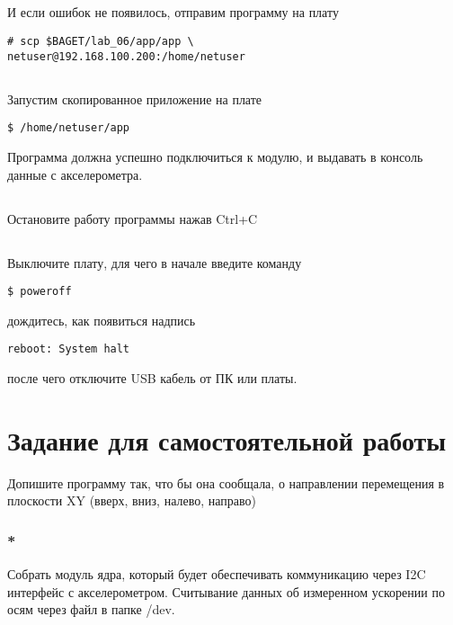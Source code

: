 \subsection{}И если ошибок не появилось, отправим программу на плату
\begin{lstlisting}[style=bash]
# scp $BAGET/lab_06/app/app \
netuser@192.168.100.200:/home/netuser
\end{lstlisting}

\subsection{}Запустим скопированное приложение на плате
\begin{lstlisting}[style=bash]
$ /home/netuser/app
\end{lstlisting}

Программа должна успешно подключиться к модулю, и выдавать в консоль данные с акселерометра.

\subsection{}Остановите работу программы нажав Ctrl+C

\subsection{} Выключите плату, для чего в начале введите команду
\begin{lstlisting}[style=bash]
	$ poweroff
\end{lstlisting}
дождитесь, как появиться надпись
\begin{lstlisting}[style=stdout]
	reboot: System halt
\end{lstlisting}
после чего отключите USB кабель от ПК или платы. 

\section{Задание для самостоятельной работы}

Допишите программу так, что бы она сообщала, о направлении перемещения в плоскости XY (вверх, вниз, налево, направо)

\subsubsection{*} Собрать модуль ядра, который будет обеспечивать коммуникацию через I2C интерфейс с акселерометром. Считывание данных об измеренном ускорении по осям через файл в папке /dev.